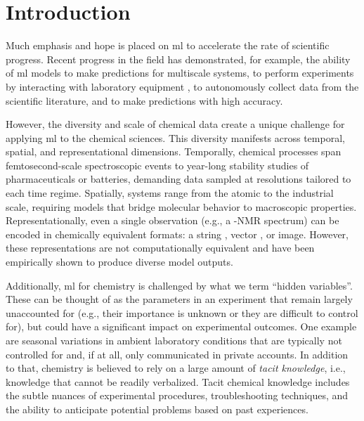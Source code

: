 \section{Introduction}


Much emphasis and hope is placed on \gls{ml} to accelerate the rate of scientific progress.\autocite{jablonka2020big,Butler_2018,yano2022case,Yao_2022,De_Luna_2017,wang2023scientific} 
Recent progress in the field has demonstrated, for example, the ability of \gls{ml} models to make predictions for multiscale systems,\autocite{charalambous2024holistic,yang2020machine, Deringer_2021} to perform experiments by interacting with laboratory equipment \autocite{boiko2023autonomous,coley2019robotic}, to autonomously collect data from the scientific literature,\autocite{schilling2025text,zhang2024fine,dagdelen2024structured} and to make predictions with high accuracy.\autocite{jablonka2024leveraging,jablonka2023machine,jung2024automatic, Rupp_2012,Keith_2021,Wu_2024} 

However, the diversity and scale of chemical data create a unique challenge for applying \gls{ml} to the chemical sciences. This diversity manifests across temporal, spatial, and representational dimensions. Temporally, chemical processes span femtosecond-scale spectroscopic events to year-long stability studies of pharmaceuticals or batteries, demanding data sampled at resolutions tailored to each time regime. 
Spatially, systems range from the atomic to the industrial scale, requiring models that bridge molecular behavior to macroscopic properties. 
Representationally, even a single observation (e.g., a -NMR spectrum) can be encoded in chemically equivalent formats: a string \autocite{alberts2024unraveling}, vector \autocite{mirza2024elucidating}, or image\autocite{alberts2024unraveling}. 
However, these representations are not computationally equivalent and have been empirically shown to produce diverse model outputs.\autocite{atz2024prospective,alampara2024probing,wu2024t,skinnider2024invalid}

Additionally, \gls{ml} for chemistry is challenged by what we term \enquote{hidden variables}. 
These can be thought of as the parameters in an experiment that remain largely unaccounted for (e.g., their importance is unknown or they are difficult to control for), but could have a significant impact on experimental outcomes. 
One example are seasonal variations in ambient laboratory conditions that are typically not controlled for and, if at all, only communicated in private accounts.\autocite{Nega_2021}
In addition to that, chemistry is believed to rely on a large amount of \emph{tacit knowledge}, i.e., knowledge that cannot be readily verbalized.\autocite{Taber_2014, Polanyi_2009}  
Tacit chemical knowledge includes the subtle nuances of experimental procedures, troubleshooting techniques, and the ability to anticipate potential problems based on past experiences.

